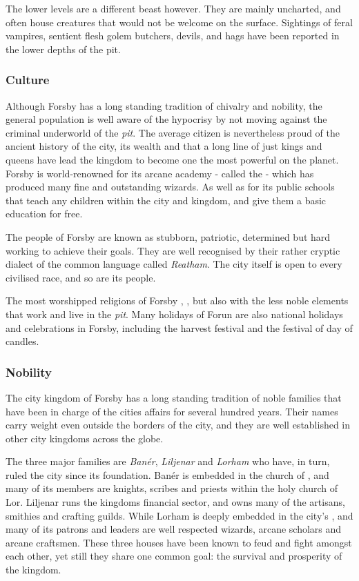 The lower levels are a different beast however. They are mainly uncharted, and
often house creatures that would not be welcome on the surface. Sightings of
feral vampires, sentient flesh golem butchers, devils, and hags have been
reported in the lower depths of the pit.

\subsubsection{Culture}

Although Forsby has a long standing tradition of chivalry and nobility, the
general population is well aware of the hypocrisy by not moving against the
criminal underworld of the \emph{pit}. The average citizen is nevertheless
proud of the ancient history of the city, its wealth and that a long line of
just kings and queens have lead the kingdom to become one the most powerful on
the planet. Forsby is world-renowned for its arcane academy - called the
 - which has produced many fine and
outstanding wizards. As well as for its public schools that teach any children
within the city and kingdom, and give them a basic education for free.

The people of Forsby are known as stubborn, patriotic, determined but hard
working to achieve their goals. They are well recognised by their rather
cryptic dialect of the common language called \emph{Reatham}. The city itself
is open to every civilised race, and so are its people.

The most worshipped religions of Forsby ,
, but also  with the less noble elements
that work and live in the \emph{pit}. Many holidays of Forun are also national
holidays and celebrations in Forsby, including the harvest festival and the
festival of day of candles.

\subsubsection{Nobility}

The city kingdom of Forsby has a long standing tradition of noble
families that have been in charge of the cities affairs for several hundred
years. Their names carry weight even outside the borders of the city, and
they are well established in other city kingdoms across the globe.

The three major families are \emph{Banér}, \emph{Liljenar} and \emph{Lorham}
who have, in turn, ruled the city since its foundation. Banér is embedded in the
church of , and many of its members are knights, scribes and
priests within the holy church of Lor. Liljenar runs the kingdoms financial
sector, and owns many of the artisans, smithies and crafting guilds. While
Lorham is deeply embedded in the city's , and
many of its patrons and leaders are well respected wizards, arcane scholars
and arcane craftsmen. These three houses have been known to feud and fight
amongst each other, yet still they share one common goal: the survival and
prosperity of the kingdom.

